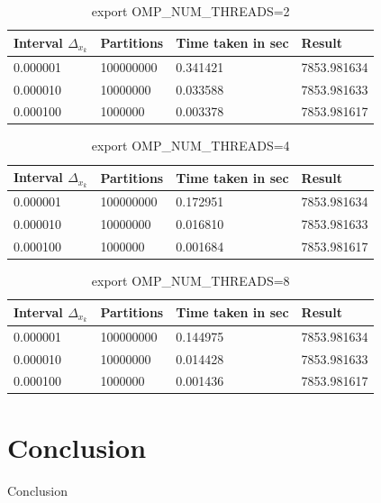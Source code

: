 		\begin{table}[h]
			\caption{export OMP\_NUM\_THREADS=2}
			\begin{center}
				\begin{tabular}{|l|l|l|l|}
					\hline
					Interval $\Delta_{x_k}$  &  Partitions  &  Time taken in sec &  Result \\
					\hline
					0.000001  &  100000000  &  0.341421  &  7853.981634 \\
					\hline
					0.000010  &  10000000  &  0.033588  &  7853.981633 \\
					\hline
					0.000100  &  1000000  &  0.003378  &  7853.981617 \\
					\hline
				\end{tabular}
			\end{center}
		\end{table}
		
		\begin{table}[h]
			\caption{export OMP\_NUM\_THREADS=4}
			\begin{center}
				\begin{tabular}{|l|l|l|l|}
					\hline
					Interval $\Delta_{x_k}$  &  Partitions  &  Time taken in sec &  Result \\
					\hline
					0.000001  &  100000000  &  0.172951  &  7853.981634 \\
					\hline
					0.000010  &  10000000  &  0.016810  &  7853.981633 \\
					\hline
					0.000100  &  1000000  &  0.001684  &  7853.981617 \\
					\hline
				\end{tabular}
			\end{center}
		\end{table}
			
		\begin{table}[h]
			\caption{export OMP\_NUM\_THREADS=8}
			\begin{center}
				\begin{tabular}{|l|l|l|l|}
					\hline
					Interval $\Delta_{x_k}$  &  Partitions  &  Time taken in sec &  Result \\
					\hline
					0.000001  &  100000000  &  0.144975  &  7853.981634 \\
					\hline
					0.000010  &  10000000  &  0.014428  &  7853.981633 \\
					\hline
					0.000100  &  1000000  &  0.001436  &  7853.981617 \\
					\hline
				\end{tabular}
			\end{center}
		\end{table}
	
	\section{Conclusion}
	\par Conclusion
	
	
	
